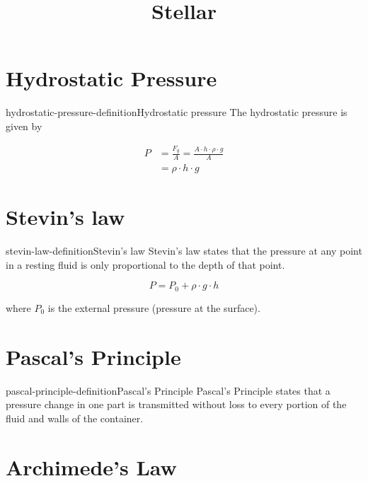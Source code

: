 \documentclass[preview]{standalone}
\begin{document}
\title{Stellar}
\genpage

\section{Hydrostatic Pressure}

\begin{snippetdefinition}{hydrostatic-pressure-definition}{Hydrostatic pressure}
    The hydrostatic pressure is given by
    
    \begin{align*}
        P &= \frac{F_g}{A} = \frac{A \cdot h \cdot \rho \cdot g}{A} \\
        &= \rho \cdot h \cdot g
    \end{align*}
\end{snippetdefinition}


\section{Stevin's law}

\begin{snippetdefinition}{stevin-law-definition}{Stevin's law}
    Stevin's law states that the pressure at any point
    in a resting fluid is only proportional to the depth of that point.

    \[
        P = P_0 + \rho \cdot g \cdot h
    \]

    where \(P_0\) is the external pressure (pressure at the surface).
\end{snippetdefinition}

\section{Pascal's Principle}

\begin{snippetdefinition}{pascal-principle-definition}{Pascal's Principle}
    Pascal's Principle states that a pressure change in one part
is transmitted without loss to every portion of the fluid and walls of the container.
\end{snippetdefinition}

\section{Archimede's Law}
\end{document}

